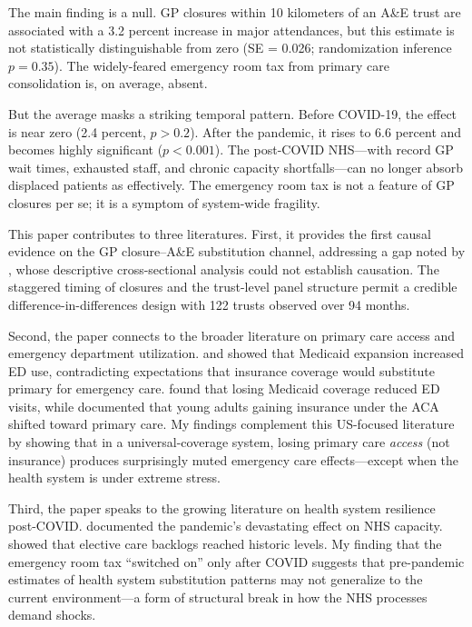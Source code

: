 \documentclass[12pt]{article}
\begin{document}
The main finding is a null. GP closures within 10 kilometers of an A\&E trust are associated with a 3.2 percent increase in major attendances, but this estimate is not statistically distinguishable from zero (SE = 0.026; randomization inference $p = 0.35$). The widely-feared emergency room tax from primary care consolidation is, on average, absent.

But the average masks a striking temporal pattern. Before COVID-19, the effect is near zero (2.4 percent, $p > 0.2$). After the pandemic, it rises to 6.6 percent and becomes highly significant ($p < 0.001$). The post-COVID NHS---with record GP wait times, exhausted staff, and chronic capacity shortfalls---can no longer absorb displaced patients as effectively. The emergency room tax is not a feature of GP closures per se; it is a symptom of system-wide fragility.

This paper contributes to three literatures. First, it provides the first causal evidence on the GP closure--A\&E substitution channel, addressing a gap noted by \citet{munro2023impact}, whose descriptive cross-sectional analysis could not establish causation. The staggered timing of closures and the trust-level panel structure permit a credible difference-in-differences design with 122 trusts observed over 94 months.

Second, the paper connects to the broader literature on primary care access and emergency department utilization. \citet{taubman2014medicaid} and \citet{finkelstein2012oregon} showed that Medicaid expansion increased ED use, contradicting expectations that insurance coverage would substitute primary for emergency care. \citet{garthwaite2012giving} found that losing Medicaid coverage reduced ED visits, while \citet{miller2012health} documented that young adults gaining insurance under the ACA shifted toward primary care. My findings complement this US-focused literature by showing that in a universal-coverage system, losing primary care \textit{access} (not insurance) produces surprisingly muted emergency care effects---except when the health system is under extreme stress.

Third, the paper speaks to the growing literature on health system resilience post-COVID. \citet{propper2020nhs} documented the pandemic's devastating effect on NHS capacity. \citet{stoye2022nhs} showed that elective care backlogs reached historic levels. My finding that the emergency room tax ``switched on'' only after COVID suggests that pre-pandemic estimates of health system substitution patterns may not generalize to the current environment---a form of structural break in how the NHS processes demand shocks.
\end{document}
